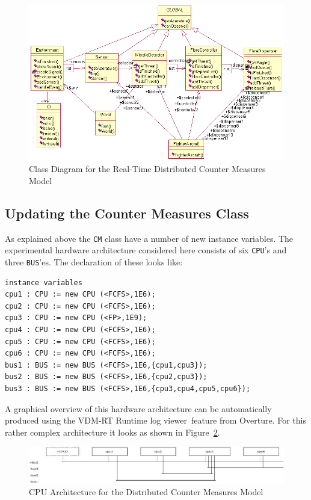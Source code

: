 \documentclass{overturerepchap}
\newcommand{\showtrace}{VDM-RT Runtime log viewer}
\begin{document}
\begin{figure}
\begin{center}
\includegraphics[width=6in]{figures/viceCMclassdiag.png}
\end{center}
\caption{Class Diagram for the Real-Time Distributed Counter Measures Model\label{fig:classdiagvice}}
\end{figure}

\subsection{Updating the Counter Measures Class}

As explained above the \texttt{CM} class have a number of new instance 
variables. The experimental hardware architecture considered here consists
of six \texttt{CPU}'s and three \texttt{BUS}'es. The declaration of these looks
like: 

\begin{lstlisting}
instance variables
cpu1 : CPU := new CPU (<FCFS>,1E6);
cpu2 : CPU := new CPU (<FCFS>,1E6);
cpu3 : CPU := new CPU (<FP>,1E9);
cpu4 : CPU := new CPU (<FCFS>,1E6);
cpu5 : CPU := new CPU (<FCFS>,1E6);
cpu6 : CPU := new CPU (<FCFS>,1E6);
bus1 : BUS := new BUS (<FCFS>,1E6,{cpu1,cpu3});
bus2 : BUS := new BUS (<FCFS>,1E6,{cpu2,cpu3});
bus3 : BUS := new BUS (<FCFS>,1E6,{cpu3,cpu4,cpu5,cpu6});
\end{lstlisting}

A graphical overview of this hardware architecture can be automatically
produced using the \showtrace\ feature from Overture. For this rather complex
architecture it looks as shown in Figure~\ref{fig:cpuarchitecture}.

\begin{figure}
\begin{center}
\includegraphics[width=\textwidth]{figures/cpuarchitecture.png}
\end{center}
\caption{CPU Architecture for the Distributed Counter Measures Model
\label{fig:cpuarchitecture}}
\end{figure}
\end{document}
